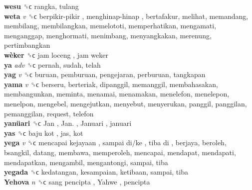 \textbf{wesu} ␝ϲ  rangka, tulang  \\
\textbf{weta} \emph{v}  ␝ϲ   berpikir-pikir ,  menghinap-hinap , bertafakur, melihat, memandang, membilang, membilangkan, memelototi, memperhatikan, mengamati, menganggap, menghormati, menimbang, menyangkakan, merenung, pertimbangkan  \\
\textbf{wèker} ␝ϲ   jam loceng ,  jam weker   \\
\textbf{ya} \emph{adv}  ␝ϲ  pernah, sudah, telah  \\
\textbf{yag} \emph{v}  ␝ϲ  buruan, pemburuan, pengejaran, perburuan, tangkapan  \\
\textbf{yama} \emph{v}  ␝ϲ  berseru, berteriak, dipanggil, memanggil, membahasakan, membangunkan, meminta, menamai, menamakan, menelefon, menelepon, menelpon, mengebel, mengejutkan, menyebut, menyerukan, panggil, panggilan, pemanggilan, request, telefon  \\
\textbf{yanüari} ␝ϲ   Jan ,  Jan. ,  Januari , januari  \\
\textbf{yas} ␝ϲ   baju kot , jas, kot  \\
\textbf{yega} \emph{v}  ␝ϲ   mencapai kejayaan ,  sampai di/ke ,  tiba di , berjaya, beroleh, bsangkil, datang, membawa, memperoleh, mencapai, mendapat, mendapati, mendapatkan, mengambil, mengantongi, sampai, tiba  \\
\textbf{yegada} ␝ϲ  kedatangan, kesampaian, ketibaan, sampai, tiba  \\
\textbf{Yehova} \emph{n}  ␝ϲ   sang pencipta ,  Yahwe , pencipta  \\
